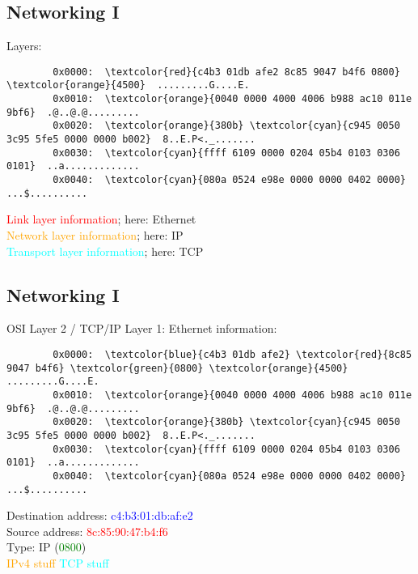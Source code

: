 \documentclass[xga]{xdvislides}
\begin{document}
\subsection{Networking I}
Layers:
\begin{Verbatim}
        0x0000:  \textcolor{red}{c4b3 01db afe2 8c85 9047 b4f6 0800} \textcolor{orange}{4500}  .........G....E.
        0x0010:  \textcolor{orange}{0040 0000 4000 4006 b988 ac10 011e 9bf6}  .@..@.@.........
        0x0020:  \textcolor{orange}{380b} \textcolor{cyan}{c945 0050 3c95 5fe5 0000 0000 b002}  8..E.P<._.......
        0x0030:  \textcolor{cyan}{ffff 6109 0000 0204 05b4 0103 0306 0101}  ..a.............
        0x0040:  \textcolor{cyan}{080a 0524 e98e 0000 0000 0402 0000}       ...$..........
\end{Verbatim}

\vspace{.25in}
\textcolor{red}{Link layer information}; here: Ethernet \\
\textcolor{orange}{Network layer information}; here: IP \\
\textcolor{cyan}{Transport layer information}; here: TCP

\subsection{Networking I}
OSI Layer 2 / TCP/IP Layer 1: Ethernet information: \\
\begin{Verbatim}
        0x0000:  \textcolor{blue}{c4b3 01db afe2} \textcolor{red}{8c85 9047 b4f6} \textcolor{green}{0800} \textcolor{orange}{4500}  .........G....E.
        0x0010:  \textcolor{orange}{0040 0000 4000 4006 b988 ac10 011e 9bf6}  .@..@.@.........
        0x0020:  \textcolor{orange}{380b} \textcolor{cyan}{c945 0050 3c95 5fe5 0000 0000 b002}  8..E.P<._.......
        0x0030:  \textcolor{cyan}{ffff 6109 0000 0204 05b4 0103 0306 0101}  ..a.............
        0x0040:  \textcolor{cyan}{080a 0524 e98e 0000 0000 0402 0000}       ...$..........
\end{Verbatim}

\vspace{.25in}
Destination address: \textcolor{blue}{c4:b3:01:db:af:e2} \\
Source address: \textcolor{red}{8c:85:90:47:b4:f6} \\
Type: IP (\textcolor{green}{0800}) \\
\textcolor{orange}{IPv4 stuff} \textcolor{cyan}{TCP stuff}
\vspace{.25in}
\end{document}

